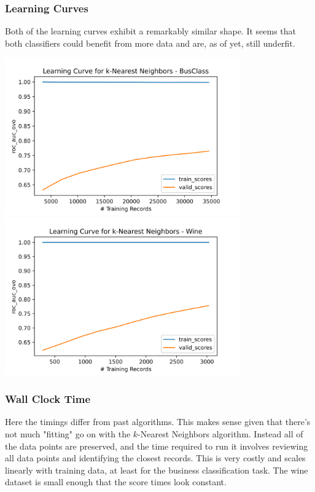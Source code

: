 \documentclass[
	letterpaper, %
]{jdf}
\begin{document}
\subsubsection{Learning Curves}
Both of the learning curves exhibit a remarkably similar shape. It seems that both classifiers could benefit from more data and are, as of yet, still underfit.

\includegraphics[width=4in]{Figures/BusClass-0920/KNN/learn_curve.png}
\includegraphics[width=4in]{Figures/Wine-0921/KNN/learn_curve.png}

\subsubsection{Wall Clock Time}
Here the timings differ from past algorithms. This makes sense given that there's not much "fitting" go on with the $k$-Nearest Neighbors algorithm. Instead all of the data points are preserved, and the time required to run it involves reviewing all data points and identifying the closest records. This is very costly and scales linearly with training data, at least for the business classification task. The wine dataset is small enough that the score times look constant.
\end{document}
